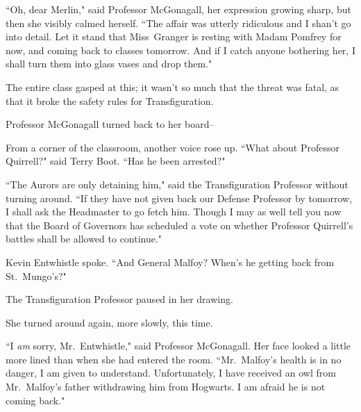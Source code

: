 ``Oh, dear Merlin," said Professor McGonagall, her expression growing sharp, but then she visibly calmed herself. ``The affair was utterly ridiculous and I shan't go into detail. Let it stand that Miss~Granger is resting with Madam Pomfrey for now, and coming back to classes tomorrow. And if I catch anyone bothering her, I shall turn them into glass vases and drop them."

The entire class gasped at this; it wasn't so much that the threat was fatal, as that it broke the safety rules for Transfiguration.

Professor McGonagall turned back to her board\---

From a corner of the classroom, another voice rose up. ``What about Professor Quirrell?" said Terry Boot. ``Has he been arrested?"

``The Aurors are only detaining him," said the Transfiguration Professor without turning around. ``If they have not given back our Defense Professor by tomorrow, I shall ask the Headmaster to go fetch him. Though I may as well tell you now that the Board of Governors has scheduled a vote on whether Professor Quirrell's battles shall be allowed to continue."

Kevin Entwhistle spoke. ``And General Malfoy? When's he getting back from St.~Mungo's?"

The Transfiguration Professor paused in her drawing.

She turned around again, more slowly, this time.

``I \emph{am} sorry, Mr.~Entwhistle," said Professor McGonagall. Her face looked a little more lined than when she had entered the room. ``Mr.~Malfoy's health is in no danger, I am given to understand. Unfortunately, I have received an owl from Mr.~Malfoy's father withdrawing him from Hogwarts. I am afraid he is not coming back."
